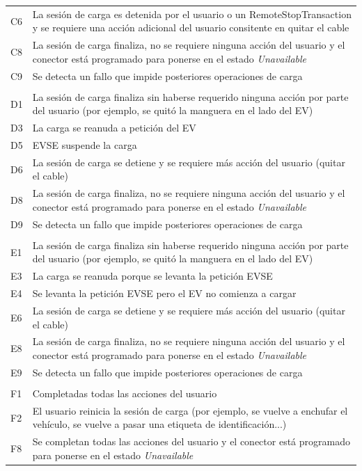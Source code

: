 \documentclass[12pt,a4paper,onecolumn,oneside]{report}
\begin{document}
\begin{longtable}{|p{1cm}|p{14cm}|}
C6 & La sesión de carga es detenida por el usuario o un RemoteStopTransaction y se requiere una acción adicional del usuario consitente en quitar el cable\\
C8 & La sesión de carga finaliza, no se requiere ninguna acción del usuario y el conector está programado para ponerse en el estado \textit{Unavailable}\\
C9 & Se detecta un fallo que impide posteriores operaciones de carga \\
 & \\
D1 & La sesión de carga finaliza sin haberse requerido ninguna acción por parte del usuario (por ejemplo, se quitó la manguera en el lado del EV)\\
D3 & La carga se reanuda a petición del EV\\
D5 & EVSE suspende la carga\\
D6 & La sesión de carga se detiene y se requiere más acción del usuario (quitar el cable)\\
D8 & La sesión de carga finaliza, no se requiere ninguna acción del usuario y el conector está programado para ponerse en el estado \textit{Unavailable}\\
D9 & Se detecta un fallo que impide posteriores operaciones de carga \\
 & \\
E1 & La sesión de carga finaliza sin haberse requerido ninguna acción por parte del usuario (por ejemplo, se quitó la manguera en el lado del EV)\\
E3 & La carga se reanuda porque se levanta la petición EVSE\\
E4 & Se levanta la petición EVSE pero el EV no comienza a cargar\\
E6 & La sesión de carga se detiene y se requiere más acción del usuario (quitar el cable)\\
E8 & La sesión de carga finaliza, no se requiere ninguna acción del usuario y el conector está programado para ponerse en el estado \textit{Unavailable}\\
E9 & Se detecta un fallo que impide posteriores operaciones de carga \\
 & \\
F1 & Completadas todas las acciones del usuario \\
F2 & El usuario reinicia la sesión de carga (por ejemplo, se vuelve a enchufar el vehículo, se vuelve a pasar una etiqueta de identificación...) \\ 
F8 & Se completan todas las acciones del usuario y el conector está programado para ponerse en el estado \textit{Unavailable}\\

\end{longtable}
\end{document}
